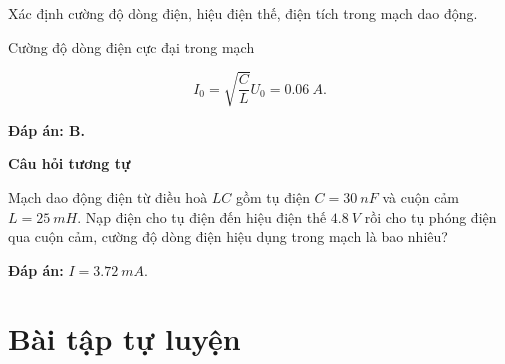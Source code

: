 \begin{dang}{Xác định cường độ dòng điện, hiệu điện thế, điện tích trong mạch dao động.}
{		Cường độ dòng điện cực đại trong mạch 
		
		$$I_{0}=\sqrt{\dfrac{C}{L}} U_{0}=\SI{0,06}{A}.$$
		
		\textbf{Đáp án: B.}
		
		
		\begin{center}
			\textbf{Câu hỏi tương tự}
		\end{center}
		
		Mạch dao động điện từ điều hoà $LC$ gồm tụ điện $C = \SI{30}{nF}$ và cuộn cảm $L = \SI{25}{mH}$. Nạp điện cho tụ điện đến hiệu điện thế $\SI{4,8}{V}$ rồi cho tụ phóng điện qua cuộn cảm, cường độ dòng điện hiệu dụng trong mạch là bao nhiêu?
		
		\textbf{Đáp án:} $I = \SI{3,72}{mA}.$
	}
	
	
\end{dang}
\section{Bài tập tự luyện}
